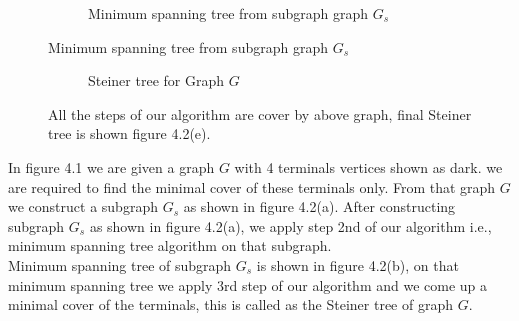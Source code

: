 \begin{figure}[H]
\begin{subfigure}{.5\textwidth}
\begin{tikzpicture}[scale=0.9, auto, node distance=2cm,
   node_style/.style={circle,draw=black},
   edge_style/.style={draw=black, ultra thick}]
    \end{tikzpicture}
  \caption{Minimum spanning tree from subgraph graph $G_s$}
\end{subfigure}



\begin{center}
    \end{center}
\end{figure}



\begin{figure}[H]
\begin{center}
\begin{subfigure}{.5\textwidth}

  \centering

  
  \caption{Steiner tree for Graph $G$}
\end{subfigure}
\end{center}
\caption{All the steps of our algorithm are cover by above graph, final Steiner tree is shown figure 4.2(e).}
\end{figure}
In figure 4.1 we are given a graph $G$ with 4 terminals vertices shown as dark. we are required to find the minimal cover of these terminals only. From that graph $G$ we construct a subgraph $G_s$ as shown in figure 4.2(a). After constructing subgraph $G_s$ as shown in figure 4.2(a), we apply step 2nd of our algorithm i.e., minimum spanning tree algorithm on that subgraph.\\ Minimum spanning tree of subgraph $G_s$ is shown in figure 4.2(b), on that minimum spanning tree we apply 3rd step of our algorithm and we come up a minimal cover of the terminals, this is called as the Steiner tree of graph $G$.



